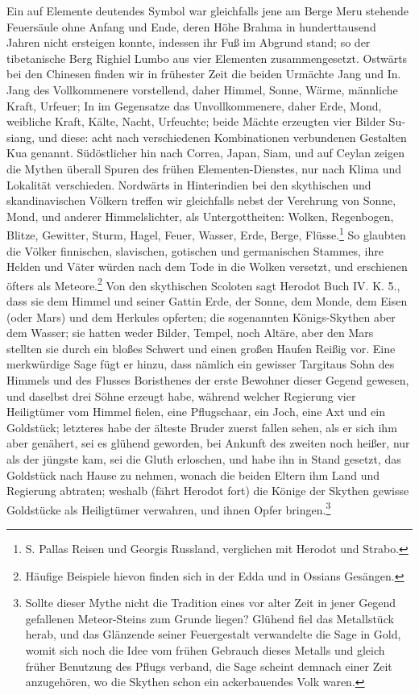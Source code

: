 \documentclass[a4paper, 11pt, oneside, polutonikogreek, german]{article}
\begin{document}
Ein auf Elemente deutendes Symbol war gleichfalls jene am Berge Meru stehende Feuersäule ohne Anfang und Ende, deren Höhe Brahma in hunderttausend Jahren nicht ersteigen konnte, indessen ihr Fuß im Abgrund stand; so der tibetanische Berg Righiel Lumbo aus vier Elementen zusammengesetzt. Ostwärts bei den Chinesen finden wir in frühester Zeit die beiden Urmächte Jang und In. Jang des Vollkommenere vorstellend, daher Himmel, Sonne, Wärme, männliche Kraft, Urfeuer; In im Gegensatze das Unvollkommenere, daher Erde, Mond, weibliche Kraft, Kälte, Nacht, Urfeuchte; beide Mächte erzeugten vier Bilder Su-siang, und diese: acht nach verschiedenen Kombinationen verbundenen Gestalten Kua genannt. Südöstlicher hin nach Correa, Japan, Siam, und auf Ceylan zeigen die Mythen überall Spuren des frühen Elementen-Dienstes, nur nach Klima und Lokalität verschieden. Nordwärts in Hinterindien bei den skythischen und skandinavischen Völkern treffen wir gleichfalls nebst der Verehrung von Sonne, Mond, und anderer Himmelslichter, als Untergottheiten: Wolken, Regenbogen, Blitze, Gewitter, Sturm, Hagel, Feuer, Wasser, Erde, Berge, Flüsse.\footnote{S. Pallas Reisen und Georgis Russland, verglichen mit Herodot und Strabo.} So glaubten die Völker finnischen, slavischen, gotischen und germanischen Stammes, ihre Helden und Väter würden nach dem Tode in die Wolken versetzt, und erschienen öfters als Meteore.\footnote{Häufige Beispiele hievon finden sich in der Edda und in Ossians Gesängen.} Von den skythischen Scoloten sagt Herodot Buch IV. K. 5., dass sie dem Himmel und seiner Gattin Erde, der Sonne, dem Monde, dem Eisen (oder Mars) und dem Herkules opferten; die sogenannten Königs-Skythen aber dem Wasser; sie hatten weder Bilder, Tempel, noch Altäre, aber den Mars stellten sie durch ein bloßes Schwert und einen großen Haufen Reißig vor. Eine merkwürdige Sage fügt er hinzu, dass nämlich ein gewisser Targitaus Sohn des Himmels und des Flusses Boristhenes der erste Bewohner dieser Gegend gewesen, und daselbst drei Söhne erzeugt habe, während welcher Regierung vier Heiligtümer vom Himmel fielen, eine Pflugschaar, ein Joch, eine Axt und ein Goldstück; letzteres habe der älteste Bruder zuerst fallen sehen, als er sich ihm aber genähert, sei es glühend geworden, bei Ankunft des zweiten noch heißer, nur als der jüngste kam, sei die Gluth erloschen, und habe ihn in Stand gesetzt, das Goldstück nach Hause zu nehmen, wonach die beiden Eltern ihm Land und Regierung abtraten; weshalb (fährt Herodot fort) die Könige der Skythen gewisse Goldstücke als Heiligtümer verwahren, und ihnen Opfer bringen.\footnote{Sollte dieser Mythe nicht die Tradition eines vor alter Zeit in jener Gegend gefallenen Meteor-Steins zum Grunde liegen? Glühend fiel das Metallstück herab, und das Glänzende seiner Feuergestalt verwandelte die Sage in Gold, womit sich noch die Idee vom frühen Gebrauch dieses Metalls und gleich früher Benutzung des Pflugs verband, die Sage scheint demnach einer Zeit anzugehören, wo die Skythen schon ein ackerbauendes Volk waren.}
\end{document}
